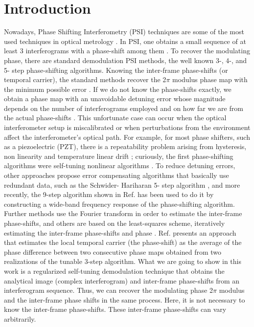 \documentclass[letterpaper,12pt]{article}   %
\begin{document}
\section{Introduction}
Nowadays, Phase Shifting Interferometry (PSI) techniques are some of
the most used techniques in optical metrology
\cite{a1_OpticalTesting}. In PSI, one obtains a small sequence of at
least 3 interferograms with a phase-shift among them
\cite{a1_OpticalTesting}. To recover the modulating phase, there are
standard demodulation PSI methods, the well known 3-, 4-, and 5- step
phase-shifting algorithms.  Knowing the inter-frame phase-shifts (or
temporal carrier), the standard methods recover the 2$\pi$ modulus
phase map with the minimum possible error
\cite{a1_OpticalTesting,a2_F_K,a3}. If we do not know the phase-shifts
exactly, we obtain a phase map with an unavoidable detuning error
whose magnitude depends on the number of interferograms employed and
on how far we are from the actual phase-shifts
\cite{a3,a4,a5,a6}. This unfortunate case can occur when the optical
interferometer setup is miscalibrated or when perturbations from the
environment affect the interferometer's optical path. For example, for
most phase shifters, such as a piezoelectric (PZT), there is a
repeatability problem arising from hysteresis, non linearity and
temperature linear drift \cite{a5,a7}; curiously, the first
phase-shifting algorithms were self-tuning nonlinear algorithms
\cite{a8,a9}. To reduce detuning errors, other approaches propose
error compensating algorithms that basically use redundant data, such
as the Schwider- Hariharan 5- step algorithm \cite{a4,a10,a11}, and
more recently, the 9-step algorithm shown in Ref. \cite{a12} has been
used to do it by constructing a wide-band frequency response of the
phase-shifting algorithm. Further methods use the Fourier transform in
order to estimate the inter-frame phase-shifts, and others are based
on the least-squares scheme, iteratively estimating the inter-frame
phase-shifts and phase \cite{a13,a14}.  Ref. \cite{a16} presents an
approach that estimates the local temporal carrier (the phase-shift)
as the average of the phase difference between two consecutive phase
maps obtained from two realizations of the tunable 3-step
algorithm. What we are going to show in this work is a regularized
self-tuning demodulation technique that obtains the analytical image
(complex interferogram) and inter-frame phase-shifts from an
interferogram sequence. Thus, we can recover the modulating phase
2$\pi$ modulus and the inter-frame phase shifts in the same
process. Here, it is not necessary to know the inter-frame
phase-shifts. These inter-frame phase-shifts can vary arbitrarily.
\end{document}
